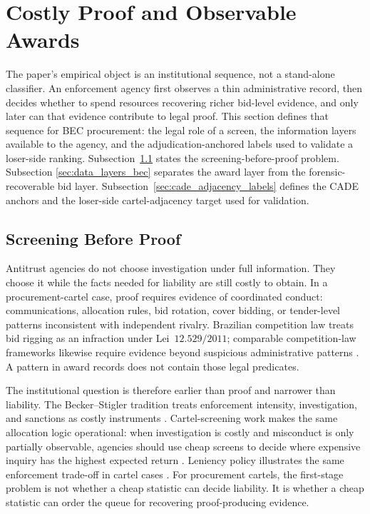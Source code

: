 \section{Costly Proof and Observable Awards}
\label{sec:setting_layers}

The paper's empirical object is an institutional sequence, not
a stand-alone classifier. An enforcement agency first observes a
thin administrative record, then decides whether to spend
resources recovering richer bid-level evidence, and only later
can that evidence contribute to legal proof. This section
defines that sequence for BEC procurement: the legal role of a
screen, the information layers available to the agency, and the
adjudication-anchored labels used to validate a loser-side
ranking. Subsection~\ref{sec:screening_before_proof} states the
screening-before-proof problem. Subsection
\ref{sec:data_layers_bec} separates the award layer from the
forensic-recoverable bid layer. Subsection~\ref{sec:cade_adjacency_labels}
defines the CADE anchors and the loser-side cartel-adjacency
target used for validation.

\subsection{Screening Before Proof}
\label{sec:screening_before_proof}

Antitrust agencies do not choose investigation under full
information. They choose it while the facts needed for liability
are still costly to obtain. In a procurement-cartel case, proof
requires evidence of coordinated conduct: communications,
allocation rules, bid rotation, cover bidding, or tender-level
patterns inconsistent with independent rivalry. Brazilian
competition law treats bid rigging as an infraction under
Lei~$12.529/2011$; comparable competition-law frameworks
likewise require evidence beyond suspicious administrative
patterns \citep{hovenkamp2005federal}. A pattern in award
records does not contain those legal predicates.

The institutional question is therefore earlier than proof and
narrower than liability. The Becker--Stigler tradition treats
enforcement intensity, investigation, and sanctions as costly
instruments
\citep{becker1968crime,stigler1970optimum}. Cartel-screening
work makes the same allocation logic operational: when
investigation is costly and misconduct is only partially
observable, agencies should use cheap screens to decide where
expensive inquiry has the highest expected return
\citep{baker2002case,harrington2008detecting,oecd2022datascreening}. Leniency
policy illustrates the same enforcement trade-off in cartel
cases \citep{wils2007leniency,wils2016leniency}. For
procurement cartels, the first-stage problem is not whether a
cheap statistic can decide liability. It is whether a cheap
statistic can order the queue for recovering proof-producing
evidence.

